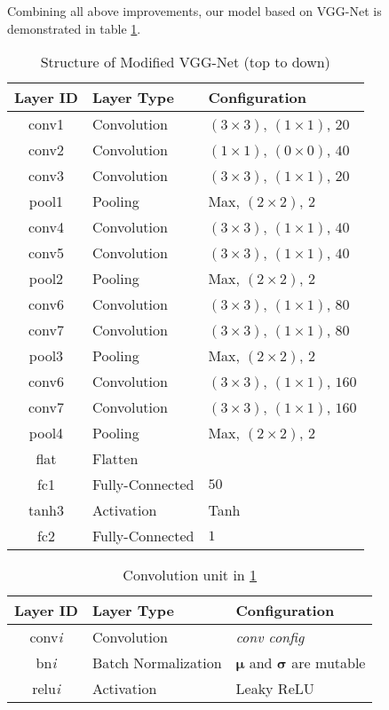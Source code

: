 Combining all above improvements, our model based on VGG-Net is demonstrated in table \ref{tab::VGG_}.
\begin{table}
    \centering
    \caption{Structure of Modified VGG-Net (top to down)}
    \label{tab::VGG_}
    \begin{tabular}{cll}
        \toprule
        Layer ID & Layer Type & Configuration \\
        \midrule
        conv1 & Convolution & $\left(3\times3\right)$, $\left(1\times1\right)$, $20$ \\
        conv2 & Convolution & $\left(1\times1\right)$, $\left(0\times0\right)$, $40$ \\
        conv3 & Convolution & $\left(3\times3\right)$, $\left(1\times1\right)$, $20$ \\
        pool1 & Pooling       & Max, $\left(2\times2\right)$, $2$ \\
        conv4 & Convolution & $\left(3\times3\right)$, $\left(1\times1\right)$, $40$ \\
        conv5 & Convolution & $\left(3\times3\right)$, $\left(1\times1\right)$, $40$ \\
        pool2 & Pooling       & Max, $\left(2\times2\right)$, $2$ \\
        conv6 & Convolution & $\left(3\times3\right)$, $\left(1\times1\right)$, $80$ \\
        conv7 & Convolution & $\left(3\times3\right)$, $\left(1\times1\right)$, $80$ \\
        pool3 & Pooling       & Max, $\left(2\times2\right)$, $2$ \\
        conv6 & Convolution & $\left(3\times3\right)$, $\left(1\times1\right)$, $160$ \\
        conv7 & Convolution & $\left(3\times3\right)$, $\left(1\times1\right)$, $160$ \\
        pool4 & Pooling       & Max, $\left(2\times2\right)$, $2$ \\
        flat  & Flatten     & \\
        fc1   & Fully-Connected & $50$ \\
        tanh3  & Activation  & Tanh \\
        fc2   & Fully-Connected & $1$ \\
        \bottomrule
    \end{tabular}
\end{table}

\begin{table}[htb]
    \centering
    \caption{Convolution unit in \ref{tab::VGG_}}
    \label{tab::VGG-CU_}
    \begin{tabular}{cll}
        \toprule
        Layer ID & Layer Type & Configuration \\
        \midrule
        conv\textit{i} & Convolution & \textit{conv config} \\
        bn\textit{i}   & Batch Normalization & $\boldsymbol{\mu}$ and $\boldsymbol{\sigma}$ are mutable \\
        relu\textit{i} & Activation  & Leaky ReLU \\
        \bottomrule
    \end{tabular}
\end{table}

